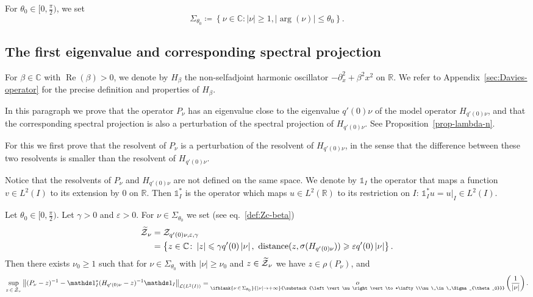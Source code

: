 \documentclass[AHL,Unicode,longabstracts,published]{cedram}
\newcommand{\abs}[1]{\left\vert #1\right\vert}
\newcommand{\nr}[1]{\left\Vert #1\right\Vert}
\newcommand{\set}[1]{\left\{ #1 \right\}}
\renewcommand{\leq}{\leqslant}
\renewcommand{\geq}{\geqslant}
\newcommand{\inv}{^{-1}}
\newcommand{\littleo}[3][]{\mathop{o}\limits_{\ifblank{#1}{#2 \to #3}{\substack{#2\to #3\\#1}}}}
\newcommand{\1}{\mathds 1}
\DeclareMathOperator{\Ree}{Re}
\DeclareMathOperator{\Sp}{\s}
\DeclareMathOperator{\distance}{distance}
\newcommand{\R}{\mathbb{R}}
\newcommand{\C}{\mathbb{C}}
\newcommand{\Lc}{{\mathcal L}}
\newcommand{\Zc}{\mathcal Z}
\newcommand{\sector}[1][\theta_0]{\Sigma_{#1}}
\renewcommand{\b}{\beta}
\newcommand{\e}{\varepsilon}
\renewcommand{\th}{\theta}
\newcommand{\s}{\sigma}
\let\oldtilde\tilde
\renewcommand*{\tilde}[1]{\mathchoice{\widetilde{#1}}{\widetilde{#1}}{\oldtilde{#1}}{\oldtilde{#1}}}
\DeclareMathOperator{\Ree}{Re}
\begin{document}
For $\theta_0\in [0,\frac{\pi}{2})$, we set
\begin{equation}\label{def:sector}
\sector \coloneqq \set{ \nu \in \C \colon \abs \nu \geq 1, \abs{\arg(\nu)} \leq \th_0}.
\end{equation}

\subsection{The first eigenvalue and corresponding spectral projection}

For $\b \in \C$ with $\Ree(\b)>0$, we denote by $H_\b$ the non-selfadjoint harmonic oscillator $-\partial_x^2 + \b^2 x^2$ on $\R$. We refer to Appendix~\ref{sec:Davies-operator} for the precise definition and properties of $H_\b$.


In this paragraph we prove that the operator $P_\nu$ has an eigenvalue close to the eigenvalue $q'(0) \nu$ of the model operator $H_{q'(0) \nu}$, and that the corresponding spectral projection is also a perturbation of the spectral projection of $H_{q'(0)\nu}$. See Proposition~\ref{prop-lambda-n}.

For this we first prove that the resolvent of $P_\nu$ is a perturbation of the resolvent of $H_{q'(0)\nu}$, in the sense that the difference between these two resolvents is smaller than the resolvent of $H_{q'(0)\nu}$.


Notice that the resolvents of $P_\nu$ and $H_{q'(0)\nu}$ are not defined on the same space. We denote by $\1_I$ the operator that maps a function $v \in L^2(I)$ to its extension by 0 on $\R$. Then $\1_I^*$ is the operator which maps $u \in L^2(\R)$ to its restriction on $I$: $\1_I^* u = u|_{I} \in L^2(I)$.


\begin{prop}\label{prop:res-Pnu}
Let $\theta_0 \in [0,\frac \pi 2)$. Let $\gamma > 0$ and $\e > 0$. For $\nu \in \sector$ we set (see eq.~\eqref{def:Zc-beta})
\begin{equation}\label{def:Zc}
\begin{split}
\tilde \Zc_\nu &= \Zc_{q'(0)\nu,\e,\gamma }\\
&= \set{z \in \C \colon \abs z \leq \gamma q'(0) \abs \nu,\ \distance(z, \Sp(H_{q'(0)\nu})) \geq \e q'(0) \abs \nu}.
\end{split}
\end{equation}
Then there exists $\nu_0 \geq 1$ such that for $\nu \in \sector$ with $\abs \nu \geq \nu_0$ and $z \in \tilde \Zc_\nu$ we have $z \in \rho(P_\nu)$, and
\[
\sup_{z\,\in\,\tilde \Zc_\nu} \nr{(P_\nu-z)\inv - \1_I^* (H_{q'(0)\nu}-z)\inv \1_I }_{\Lc\left(L^2(I)\right)} = \littleo[\nu\,\in\,\sector]{\abs \nu} {+\infty} \left(\frac 1 {\abs \nu} \right).
\]
\end{prop}
\end{document}
